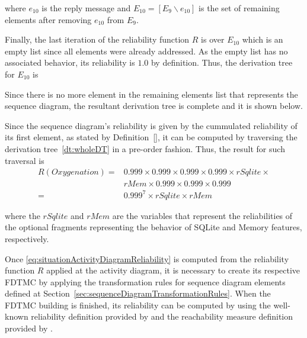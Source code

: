 
where $e_{10}$ is the reply message and $E_{10} = [E_9 \backslash e_{10}]$ is
the set of remaining elements after removing $e_{10}$ from $E_9$. 

Finally, the last iteration of the reliability function $R$ is over $E_{10}$
which is an empty list since all elements were already addressed. As the empty
list has no associated behavior, its reliability is $1.0$ by definition. Thus,
the derivation tree for $E_{10}$ is


Since there is no more element in the remaining elements list that represents
the sequence diagram, the resultant derivation tree is complete and it is shown
below.


Since the sequence diagram's reliability is given by the cummulated reliability
of its first element, as stated by Definition~\ref{}, it can be computed by
traversing the derivation tree~\ref{dt:wholeDT} in a pre-order fashion. Thus,
the result for such traversal is 
\begin{align}
R(Oxygenation) = &0.999 \times 0.999 \times 0.999 \times 0.999 \times rSqlite
\times \nonumber \\ &rMem \times 0.999 \times 0.999 \times 0.999 \nonumber \\
               = &0.999^7 \times rSqlite \times rMem
\label{eq:situationActivityDiagramReliability}
\end{align}

where the $rSqlite$ and $rMem$ are the variables that represent the
reliabilities of the optional fragments representing the behavior of SQLite and
Memory features, respectively.

Once \ref{eq:situationActivityDiagramReliability} is computed from the
reliability function $R$ applied at the activity diagram, it is necessary to
create its respective FDTMC by applying the transformation rules for sequence
diagram elements defined at
Section~\ref{sec:sequenceDiagramTransformationRules}. When the FDTMC building
is finished, its reliability can be computed by using the well-known reliability
definition provided by \cite{grunske_specification_2008} and the reachability
measure definition provided by \cite{baier_principles_2008}. 

